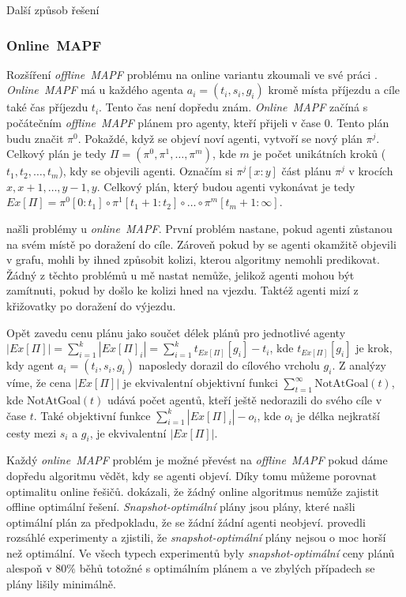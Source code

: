 Další způsob řešení

\subsubsection{Online~MAPF}\label{subsubsec:online-mapf}

Rozšíření \emph{offline~MAPF} problému na online variantu zkoumali ve své práci \citet*{Svancara}.
\emph{Online~MAPF} má u každého agenta $a_i = (t_i, s_i, g_i)$ kromě místa příjezdu a cíle také čas příjezdu $t_i$.
Tento čas není dopředu znám.
\emph{Online~MAPF} začíná s počátečním \emph{offline~MAPF} plánem pro agenty, kteří přijeli v čase $0$.
Tento plán budu značit $\pi^0$.
Pokaždé, když se objeví noví agenti, vytvoří se nový plán $\pi^j$.
Celkový plán je tedy $\Pi = (\pi^0, \pi^1, \dots, \pi^m)$, kde $m$ je počet unikátních kroků ($t_1, t_2, \dots, t_m$), kdy se objevili agenti.
Označím si $\pi^j[x:y]$ část plánu $\pi^j$ v krocích $x, x + 1, \dots, y - 1, y$.
Celkový plán, který budou agenti vykonávat je tedy $Ex[\Pi] = \pi^0[0:t_1] \circ \pi^1[t_1 + 1:t_2] \circ \dots \circ \pi^m[t_m + 1:\infty]$.

\citet{Svancara} našli problémy u \emph{online~MAPF}.
První problém nastane, pokud agenti zůstanou na svém místě po doražení do cíle.
Zároveň pokud by se agenti okamžitě objevili v grafu, mohli by ihned způsobit kolizi, kterou algoritmy nemohli predikovat.
Žádný z těchto problémů u mě nastat nemůže, jelikož agenti mohou být zamítnuti, pokud by došlo ke kolizi hned na vjezdu.
Taktéž agenti mizí z křižovatky po doražení do výjezdu.

Opět zavedu cenu plánu jako součet délek plánů pro jednotlivé agenty $|Ex[\Pi]| = \sum_{i=1}^{k} |Ex[\Pi]_i| = \sum_{i=1}^{k} t_{Ex[\Pi]}[g_i] - t_i$,
kde $t_{Ex[\Pi]}[g_i]$ je krok, kdy agent $a_i = (t_i, s_i, g_i)$ naposledy dorazil do cílového vrcholu $g_i$.
Z analýzy \citet{Svancara} víme, že cena $|Ex[\Pi]|$ je ekvivalentní objektivní funkci $\sum_{t=1}^{\infty} \textrm{NotAtGoal}(t)$,
kde $\textrm{NotAtGoal}(t)$ udává počet agentů, kteří ještě nedorazili do svého cíle v čase $t$.
Také objektivní funkce $\sum_{i=1}^{k} |Ex[\Pi]_i| - o_i$, kde $o_i$ je délka nejkratší cesty mezi $s_i$ a $g_i$,
je ekvivalentní $|Ex[\Pi]|$.

Každý \emph{online~MAPF} problém je možné převést na \emph{offline~MAPF} pokud dáme dopředu algoritmu vědět, kdy se agenti objeví.
Díky tomu můžeme porovnat optimalitu online řešičů.
\citet{Svancara} dokázali, že žádný online algoritmus nemůže zajistit offline optimální řešení.
\emph{Snapshot-optimální} plány jsou plány, které našli optimální plán za předpokladu, že se  žádní žádní agenti neobjeví.
\citet*{Morag} provedli rozsáhlé experimenty a zjistili, že \emph{snapshot-optimální} plány nejsou o moc horší než optimální.
Ve všech typech experimentů byly \emph{snapshot-optimální} ceny plánů alespoň v $80\%$ běhů totožné s optimálním plánem
a ve zbylých případech se plány lišily minimálně.

